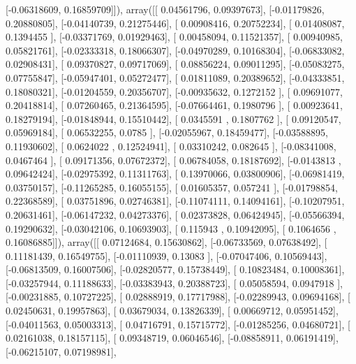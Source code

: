 \documentclass{article}
\begin{document}
       [-0.06318609,  0.16859709]]), array([[ 0.04561796,  0.09397673],
       [-0.01179826,  0.20880805],
       [-0.04140739,  0.21275446],
       [ 0.00908416,  0.20752234],
       [ 0.01408087,  0.1394455 ],
       [-0.03371769,  0.01929463],
       [ 0.00458094,  0.11521357],
       [ 0.00940985,  0.05821761],
       [-0.02333318,  0.18066307],
       [-0.04970289,  0.10168304],
       [-0.06833082,  0.02908431],
       [ 0.09370827,  0.09717069],
       [ 0.08856224,  0.09011295],
       [-0.05083275,  0.07755847],
       [-0.05947401,  0.05272477],
       [ 0.01811089,  0.20389652],
       [-0.04333851,  0.18080321],
       [-0.01204559,  0.20356707],
       [-0.00935632,  0.1272152 ],
       [ 0.09691077,  0.20418814],
       [ 0.07260465,  0.21364595],
       [-0.07664461,  0.1980796 ],
       [ 0.00923641,  0.18279194],
       [-0.01848944,  0.15510442],
       [ 0.0345591 ,  0.1807762 ],
       [ 0.09120547,  0.05969184],
       [ 0.06532255,  0.0785    ],
       [-0.02055967,  0.18459477],
       [-0.03588895,  0.11930602],
       [ 0.0624022 ,  0.12524941],
       [ 0.03310242,  0.082645  ],
       [-0.08341008,  0.0467464 ],
       [ 0.09171356,  0.07672372],
       [ 0.06784058,  0.18187692],
       [-0.0143813 ,  0.09642424],
       [-0.02975392,  0.11311763],
       [ 0.13970066,  0.03800906],
       [-0.06981419,  0.03750157],
       [-0.11265285,  0.16055155],
       [ 0.01605357,  0.057241  ],
       [-0.01798854,  0.22368589],
       [ 0.03751896,  0.02746381],
       [-0.11074111,  0.14094161],
       [-0.10207951,  0.20631461],
       [-0.06147232,  0.04273376],
       [ 0.02373828,  0.06424945],
       [-0.05566394,  0.19290632],
       [-0.03042106,  0.10693903],
       [ 0.115943  ,  0.10942095],
       [ 0.1064656 ,  0.16086885]]), array([[ 0.07124684,  0.15630862],
       [-0.06733569,  0.07638492],
       [ 0.11181439,  0.16549755],
       [-0.01110939,  0.13083   ],
       [-0.07047406,  0.10569443],
       [-0.06813509,  0.16007506],
       [-0.02820577,  0.15738449],
       [ 0.10823484,  0.10008361],
       [-0.03257944,  0.11188633],
       [-0.03383943,  0.20388723],
       [ 0.05058594,  0.0947918 ],
       [-0.00231885,  0.10727225],
       [ 0.02888919,  0.17717988],
       [-0.02289943,  0.09694168],
       [ 0.02450631,  0.19957863],
       [ 0.03679034,  0.13826339],
       [ 0.00669712,  0.05951452],
       [-0.04011563,  0.05003313],
       [ 0.04716791,  0.15715772],
       [-0.01285256,  0.04680721],
       [ 0.02161038,  0.18157115],
       [ 0.09348719,  0.06046546],
       [-0.08858911,  0.06191419],
       [-0.06215107,  0.07198981],
\end{document}
